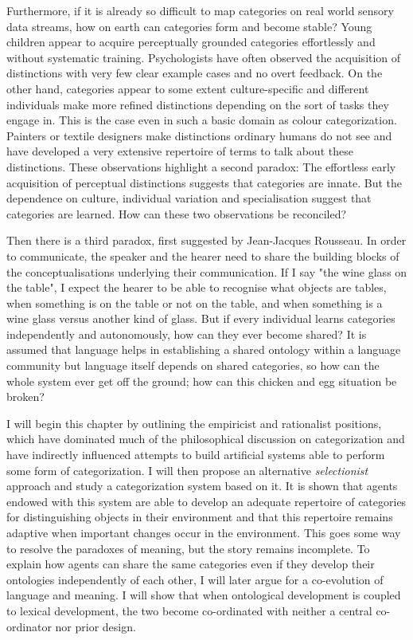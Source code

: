 Furthermore, if it is already so difficult to map
categories on real world sensory data streams, how 
on earth can categories form and become stable? 
Young children appear to acquire perceptually 
grounded categories effortlessly and without systematic 
training. Psychologists have often observed the 
acquisition of distinctions
with very few clear example cases and no overt feedback. 
On the other hand, categories appear to 
some extent culture-specific and different 
individuals make more refined distinctions depending
on the sort of tasks they engage in. This is 
the case even in such a basic domain as colour categorization. 
Painters or textile designers make distinctions ordinary 
humans do not see and have developed a very extensive
repertoire of terms to talk about these distinctions. 
These observations highlight a second paradox: The 
effortless early acquisition of perceptual distinctions 
suggests that categories 
are innate. But the dependence on culture, individual
variation and specialisation suggest that categories
are learned. How can these two observations be reconciled? 

Then there is a third paradox, first suggested
by Jean-Jacques Rousseau. In order to communicate,
the speaker and the hearer need to share the building
blocks of the conceptualisations underlying their communication. 
If I say "the wine glass on the table", I expect 
the hearer to be able to recognise what objects are 
tables, when something is on the table or not on the table, and 
when something is a wine glass versus another kind 
of glass. But if every individual learns categories independently
and autonomously, how can they ever become shared? It is 
assumed that language helps in establishing a shared ontology within 
a language community but language itself depends on 
shared categories, so how can the whole system ever 
get off the ground; how can this chicken and egg situation
be broken?

I will begin this chapter by outlining the empiricist 
and rationalist positions, which have 
dominated much of the philosophical discussion on 
categorization and have indirectly influenced attempts 
to build artificial systems able to perform some form
of categorization. 
I will then propose an alternative {\it selectionist} approach
and study a categorization system based on it. It is 
shown that agents endowed with this system are able
to develop an adequate repertoire of categories for 
distinguishing objects in their environment and that 
this repertoire remains adaptive when important changes 
occur in the environment. This goes some way to 
resolve the paradoxes of meaning, but the story remains
incomplete. To explain how agents can share the same 
categories even if they develop their ontologies 
independently of each other, I will later argue for
a co-evolution of language and meaning. I will show
that when ontological development is coupled to lexical 
development, the two become co-ordinated with neither
a central co-ordinator nor prior design. 

